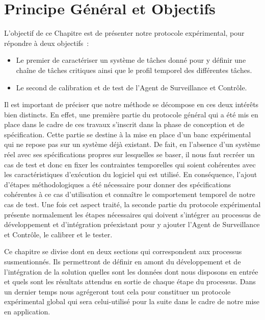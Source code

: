 \documentclass[french, a4paper, 11pt, twoside, pdftex]{StyleThese}
\begin{document}
\section{Principe Général et Objectifs}
        L'objectif de ce Chapitre est de présenter notre protocole expérimental, pour répondre à deux objectifs~: 
        \begin{itemize}
        	\item Le premier de caractériser un système de tâches donné pour y définir une chaîne de tâches critiques ainsi que le profil temporel des différentes tâches. 
        	\item         Le second de calibration et de test de l'Agent de Surveillance et Contrôle.
        \end{itemize}
        Il est important de préciser que notre méthode se décompose en ces deux intérêts bien distincts. En effet, une première partie du protocole général qui a été mis en place dans le cadre de ces travaux s'inscrit dans la phase de conception et de spécification. Cette partie se destine à la mise en place d'un banc expérimental qui ne repose pas sur un système déjà existant. De fait, en l'absence d'un système réel avec ses  spécifications propres sur lesquelles se baser, il nous faut recréer un cas de test et donc en fixer les contraintes temporelles qui soient cohérentes avec les caractéristiques d'exécution du logiciel qui est utilisé. En conséquence, l'ajout d'étapes méthodologiques a été nécessaire pour donner des spécifications cohérentes à ce cas d'utilisation et connaître le comportement temporel de notre cas de test. 
        Une fois cet aspect traité, la seconde partie du protocole expérimental présente normalement les étapes nécessaires qui doivent s'intégrer au processus de développement et d'intégration préexistant pour y ajouter l'Agent de Surveillance et Contrôle, le calibrer et le tester.
        
        Ce chapitre se divise dont en deux sections qui correspondent aux processus susmentionnés. Ils permettront de définir en amont du développement et de l'intégration de la solution quelles sont les données dont nous disposons en entrée et quels sont les résultats attendus en sortie de chaque étape du processus. Dans un dernier temps nous agrégeront tout cela pour constituer un protocole expérimental global qui sera celui-utilisé pour la suite dans le cadre de notre mise en application.
       
        
\end{document}
